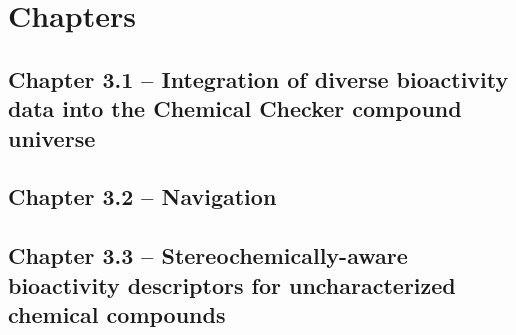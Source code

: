 
\chapter{Chapters}
\newpage



\section{Chapter 3.1 -- Integration of diverse bioactivity data into the Chemical Checker compound universe}
\setcounter{figure}{0}
\renewcommand{\thefigure}{3.\arabic{section}.\arabic{figure}}






\newpage



\section{Chapter 3.2 -- Navigation}
\renewcommand{\thefigure}{3.\arabic{section}.\arabic{figure}}





\newpage



\section{Chapter 3.3 -- Stereochemically-aware bioactivity descriptors for uncharacterized chemical compounds}
\setcounter{figure}{0}
\renewcommand{\thefigure}{3.\arabic{section}.\arabic{figure}}






\newpage


